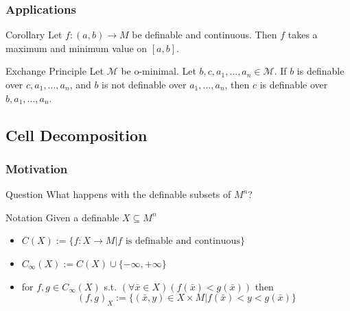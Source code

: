 \begin{frame}[c]\frametitle{Applications}	
    
	\begin{block}{Corollary}
		Let $f:(a,b) \to M$ be definable and continuous. Then $f$ takes a maximum and minimum value on $[a,b]$.
	\end{block}

	\begin{block}{Exchange Principle \citep{pillay1986definable}}
		Let $\mathcal{M}$ be o-minimal.
		Let $b,c,a_1,\ldots,a_n \in \mathcal{M}$.
		If $b$ is definable over $c,a_1,\ldots,a_n$, and $b$ is not definable over $a_1,\ldots,a_n$, then $c$ is definable over $b,a_1,\ldots,a_n$.
	\end{block}

\end{frame}

\subsection{Cell Decomposition}

\begin{frame}[c]\frametitle{Motivation}
	
	\begin{beamerboxesrounded}[shadow=true, upper=question]{Question}
		What happens with the definable subsets of $M^n$?
	\end{beamerboxesrounded}
    
	\begin{beamerboxesrounded}[shadow=true]{Notation}
		Given a definable $X \subseteq M^n$
		\begin{itemize}
			\item $C(X):= \{ f:X \to M|f \text{ is definable and continuous}\}$
			\item $C_\infty(X):=C(X) \cup \{ -\infty, +\infty \}$
			\item for $f,g \in C_\infty(X)$ s.t. $(\forall \bar{x} \in X)(f(\bar{x})<g(\bar{x}))$ then 
			$$(f,g)_X := \{  (\bar{x},y)\in X \times M|f(\bar{x})<y<g(\bar{x})\}$$
		\end{itemize}
	\end{beamerboxesrounded}

\end{frame}

